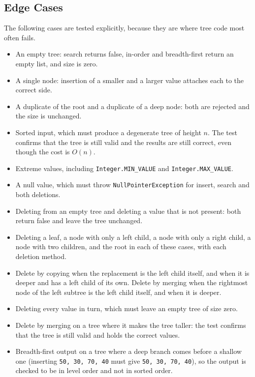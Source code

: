 \subsection{Edge Cases}
The following cases are tested explicitly, because they are where tree code most often fails.
\begin{itemize}
    \item An empty tree: search returns false, in-order and breadth-first return an empty list, and size is zero.
    \item A single node: insertion of a smaller and a larger value attaches each to the correct side.
    \item A duplicate of the root and a duplicate of a deep node: both are rejected and the size is unchanged.
    \item Sorted input, which must produce a degenerate tree of height $n$. The test confirms that the tree is still valid and the results are still correct, even though the cost is $O(n)$.
    \item Extreme values, including \texttt{Integer.MIN\_VALUE} and \texttt{Integer.MAX\_VALUE}.
    \item A null value, which must throw \texttt{NullPointerException} for insert, search and both deletions.
    \item Deleting from an empty tree and deleting a value that is not present: both return false and leave the tree unchanged.
    \item Deleting a leaf, a node with only a left child, a node with only a right child, a node with two children, and the root in each of these cases, with each deletion method.
    \item Delete by copying when the replacement is the left child itself, and when it is deeper and has a left child of its own. Delete by merging when the rightmost node of the left subtree is the left child itself, and when it is deeper.
    \item Deleting every value in turn, which must leave an empty tree of size zero.
    \item Delete by merging on a tree where it makes the tree taller: the test confirms that the tree is still valid and holds the correct values.
    \item Breadth-first output on a tree where a deep branch comes before a shallow one (inserting \texttt{50, 30, 70, 40} must give \texttt{50, 30, 70, 40}), so the output is checked to be in level order and not in sorted order.
\end{itemize}


